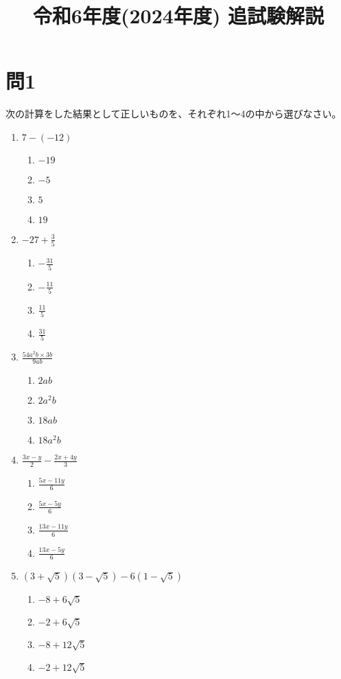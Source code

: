 \documentclass{ltjsarticle}
\begin{document}
\title{令和6年度(2024年度) 追試験解説}

\section*{問1}
次の計算をした結果として正しいものを、それぞれ1～4の中から選びなさい。

\begin{enumerate}
    \item $7 - (-12)$
    \begin{enumerate}
        \item $-19$ \quad \item $-5$ \quad \item $5$ \quad \item $19$
    \end{enumerate}
    \item $-27 + \frac{3}{5}$
    \begin{enumerate}
        \item $-\frac{31}{5}$ \quad \item $-\frac{11}{5}$ \quad \item $\frac{11}{5}$ \quad \item $\frac{31}{5}$
    \end{enumerate}
    \item $\frac{54a^2b \times 3b}{9ab}$
    \begin{enumerate}
        \item $2ab$ \quad \item $2a^2b$ \quad \item $18ab$ \quad \item $18a^2b$
    \end{enumerate}
    \item $\frac{3x - y}{2} - \frac{2x + 4y}{3}$
    \begin{enumerate}
        \item $\frac{5x - 11y}{6}$ \quad \item $\frac{5x - 5y}{6}$ \quad \item $\frac{13x - 11y}{6}$ \quad \item $\frac{13x - 5y}{6}$
    \end{enumerate}
    \item $(3+\sqrt{5})(3-\sqrt{5}) - 6(1 - \sqrt{5})$
    \begin{enumerate}
        \item $-8 + 6\sqrt{5}$ \quad \item $-2 + 6\sqrt{5}$ \quad \item $-8 + 12\sqrt{5}$ \quad \item $-2 + 12\sqrt{5}$
    \end{enumerate}
\end{enumerate}
\end{document}
